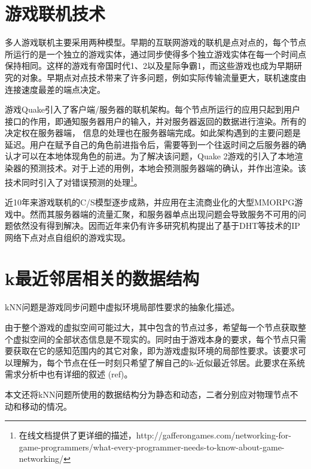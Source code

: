 \section{游戏联机技术}
\par
多人游戏联机主要采用两种模型。早期的互联网游戏的联机是点对点的，每个节点所运行的是一个独立的游戏实体，通过同步使得多个独立游戏实体在每一个时间点保持相同。这样的游戏有帝国时代1、2以及星际争霸1，而这些游戏也成为早期研究的对象\cite{IPMOGInfo}。早期点对点技术带来了许多问题，例如实际传输流量更大，联机速度由连接速度最差的端点决定。
\par
游戏Quake引入了客户端/服务器的联机架构。每个节点所运行的应用只起到用户接口的作用，即通知服务器用户的输入，并对服务器返回的数据进行渲染。所有的决定权在服务器端， 信息的处理也在服务器端完成。如此架构遇到的主要问题是延迟。用户在赋予自己的角色前进指令后，需要等到一个往返时间之后服务器的确认才可以在本地体现角色的前进。为了解决该问题，Quake 2游戏的引入了本地渲染器的预测技术。对于上述的用例，本地会预测服务器端的确认，并作出渲染。该技术同时引入了对错误预测的处理\footnote{在线文档提供了更详细的描述，http://gafferongames.com/networking-for-game-programmers/what-every-programmer-needs-to-know-about-game-networking/}。
\par
近10年来游戏联机的C/S模型逐步成熟，并应用在主流商业化的大型MMORPG游戏中。然而其服务器端的流量汇聚，和服务器单点出现问题会导致服务不可用的问题依然没有得到解决。因而近年来仍有许多研究机构提出了基于DHT等技术的IP网络下点对点自组织的游戏实现\cite{IPP2PMMORPG,IPP2PMMORPG2,IPP2PMMORPG1}。

\section{k最近邻居相关的数据结构}
\label{kNNIntroSection}
\par
kNN问题是游戏同步问题中虚拟环境局部性要求的抽象化描述。
\par
由于整个游戏的虚拟空间可能过大，其中包含的节点过多，希望每一个节点获取整个虚拟空间的全部状态信息是不现实的。同时由于游戏本身的要求，每个节点只需要获取在它的感知范围内的其它对象，即为游戏虚拟环境的局部性要求。该要求可以理解为，每个节点在任一时刻只希望了解自己的k-近似最近邻居。此要求在系统需求分析中也有详细的叙述 (ref)。
\par
本文还将kNN问题所使用的数据结构分为静态和动态，二者分别应对物理节点不动和移动的情况。

